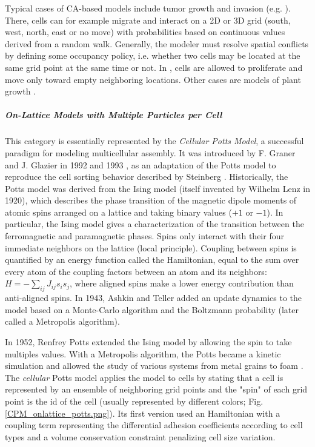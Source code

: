 Typical cases of CA-based models include tumor growth and invasion (e.g. \cite{Anderson:2007ib}). There, cells can for example migrate and interact on a 2D or 3D grid (south, west, north, east or no move) with probabilities based on continuous values derived from a random walk. Generally, the modeler must resolve spatial conflicts by defining some occupancy policy, i.e. whether two cells may be located at the same grid point at the same time or not. In \cite{Anderson:2007ib}, cells are allowed to proliferate and move only toward empty neighboring locations. Other cases are models of plant growth \cite{Peak:2004jt}.

\subparagraph{On-Lattice Models with Multiple Particles per Cell}


This category is essentially represented by the \textit{Cellular Potts Model}, a successful paradigm for modeling multicellular assembly. It was introduced by F. Graner and J. Glazier in 1992 and 1993 \cite{Graner:1992ve}, \cite{Glazier:1993ck} as an adaptation of the Potts model to reproduce the cell sorting behavior described by Steinberg \cite{Glazier:1993ck}. Historically, the Potts model was derived from the Ising model (itself invented by Wilhelm Lenz in 1920), which describes the phase transition of the magnetic dipole moments of atomic spins arranged on a lattice and taking binary values ($+1$ or $-1$). In particular, the Ising model gives a characterization of the transition between the ferromagnetic and paramagnetic phases. Spins only interact with their four immediate neighbors on the lattice (local principle). Coupling between spins is quantified by an energy function called the Hamiltonian, equal to the sum over every atom of the coupling factors between an atom and its neighbors: $H = -\sum_{ij}J_{ij}s_i s_j$, where aligned spins make a lower energy contribution than anti-aligned spins. In 1943, Ashkin and Teller added an update dynamics to the model based on a Monte-Carlo algorithm and the Boltzmann probability (later called a Metropolis algorithm).

In 1952, Renfrey Potts extended the Ising model by allowing the spin to take multiples values. With a Metropolis algorithm, the Potts became a kinetic simulation and allowed the study of various systems from metal grains to foam \cite{Glazier:2007hm}. The \textit{cellular} Potts model applies the model to cells by stating that a cell is represented by an ensemble of neighboring grid points and the "spin" of each grid point is the id of the cell (usually represented by different colors; Fig. \ref{CPM_onlattice_potts.png}). Its first version used an Hamiltonian with a coupling term representing the differential adhesion coefficients according to cell types and a volume conservation constraint penalizing cell size variation.

